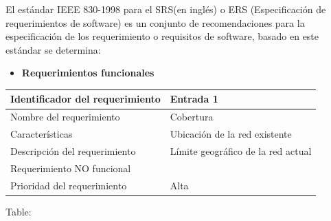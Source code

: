 \documentclass[]{article}
\providecommand{\tightlist}{%
  \setlength{\itemsep}{0pt}\setlength{\parskip}{0pt}}
\begin{document}
El estándar IEEE 830-1998 para el SRS(en inglés) o ERS (Especificación
de requerimientos de software) es un conjunto de recomendaciones para la
especificación de los requerimiento o requisitos de software, basado en
este estándar se determina:

\begin{itemize}
\tightlist
\item
  \textbf{Requerimientos funcionales}
\end{itemize}

\begin{longtable}[]{@{}ll@{}}
\toprule
Identificador del requerimiento & Entrada 1\tabularnewline
\midrule
\endhead
Nombre del requerimiento & Cobertura\tabularnewline
Características & Ubicación de la red existente\tabularnewline
Descripción del requerimiento & Límite geográfico de la red
actual\tabularnewline
Requerimiento NO funcional &\tabularnewline
Prioridad del requerimiento & Alta\tabularnewline
\bottomrule
\end{longtable}

Table:
\end{document}
